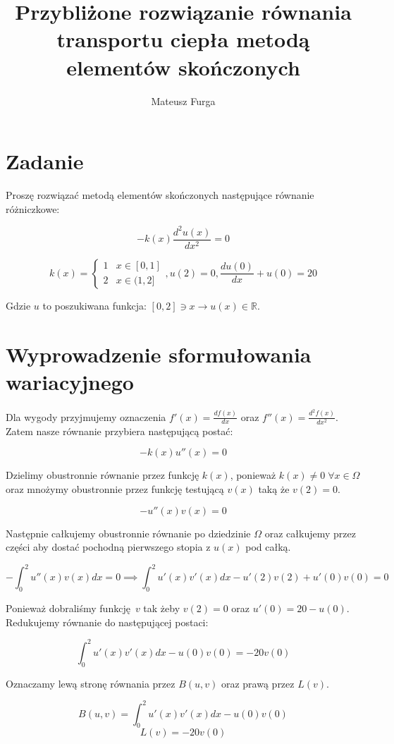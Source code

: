 \documentclass{article}
\title{Przybliżone rozwiązanie równania transportu ciepła metodą elementów skończonych}
\author{Mateusz Furga}
\begin{document}
\maketitle


\section{Zadanie}

Proszę rozwiązać metodą elementów skończonych następujące równanie
różniczkowe:

\[
    -k(x)\frac{d^2u(x)}{dx^2}=0
\]

\[
    k(x) = \begin{cases} 1 & x \in [0,1] \\ 2 & x \in (1,2] \end{cases}, u(2) = 0, \frac{du(0)}{dx} + u(0) = 20
\]

Gdzie \( u \) to poszukiwana funkcja: \( [0,2] \ni x \rightarrow u(x) \in \mathbb{R} \).

\section{Wyprowadzenie sformułowania wariacyjnego}

Dla wygody przyjmujemy oznaczenia \( f'(x) = \frac{df(x)}{dx} \) oraz \( f''(x) = \frac{d^2f(x)}{dx^2} \). Zatem nasze równanie przybiera następującą postać:

\[
    -k(x)u''(x)=0
\]

Dzielimy obustronnie równanie przez funkcję \( k(x) \), ponieważ \(k(x) \neq 0 \; \forall x \in \Omega\) oraz mnożymy obustronnie przez funkcję testującą \( v(x) \) taką że \( v(2) = 0 \).

\[
    -u''(x)v(x) = 0
\]

Następnie całkujemy obustronnie równanie po dziedzinie \( \Omega \) oraz całkujemy przez części aby dostać pochodną pierwszego stopia z \( u(x) \) pod całką.

\[
-\int_{0}^{2} u''(x)v(x) dx = 0 \implies \int_{0}^{2} u'(x)v'(x) dx - u'(2)v(2) + u'(0)v(0) = 0
\]

Ponieważ dobraliśmy funkcję \( v \) tak żeby \( v(2) = 0 \) oraz \( u'(0) = 20 - u(0) \). Redukujemy równanie do następującej postaci: 

\[
\int_{0}^{2} u'(x)v'(x) dx - u(0)v(0) = -20v(0)
\]

Oznaczamy lewą stronę równania przez \( B(u, v) \) oraz prawą przez \( L(v) \).

\[
    B(u, v) = \int_{0}^{2} u'(x)v'(x) dx - u(0)v(0)
\]
\[
    L(v) = -20v(0)
\]
\end{document}
